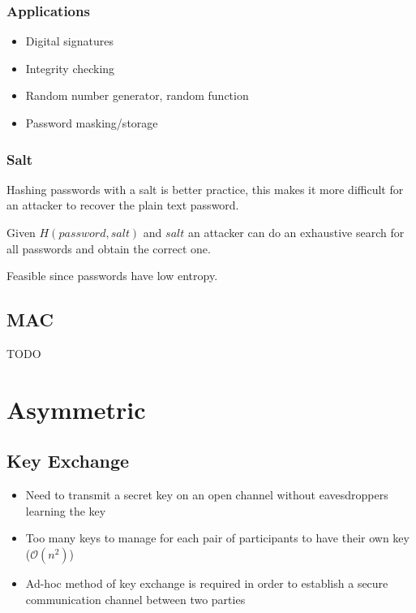 \documentclass[a4paper]{article}
\begin{document}
\subsubsection{Applications}

\begin{itemize}
  \item Digital signatures
  \item Integrity checking
  \item Random number generator, random function
  \item Password masking/storage
\end{itemize}

\subsubsection{Salt}

Hashing passwords with a salt is better practice, this makes it more difficult
for an attacker to recover the plain text password.


Given $H(password, salt)$ and $salt$ an attacker can do an exhaustive search for
all passwords and obtain the correct one.

Feasible since passwords have low entropy.

\subsection{MAC}

TODO

\section{Asymmetric}

\subsection{Key Exchange}

\begin{itemize}
  \item Need to transmit a secret key on an open channel without eavesdroppers
        learning the key
  \item Too many keys to manage for each pair of participants to have their own
        key ($\mathcal{O}(n^{2})$)
  \item Ad-hoc method of key exchange is required in order to establish a secure
        communication channel between two parties
\end{itemize}
\end{document}
